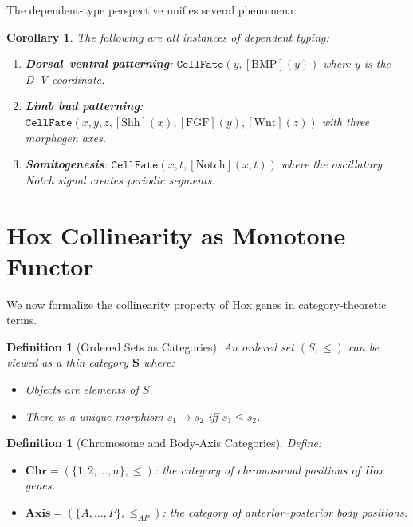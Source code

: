 \documentclass[12pt,a4paper]{article}
\newtheorem{corollary}[theorem]{Corollary}
\newtheorem{definition}[theorem]{Definition}
\begin{document}
The dependent-type perspective unifies several phenomena:

\begin{corollary}
The following are all instances of dependent typing:
\begin{enumerate}
  \item \textbf{Dorsal--ventral patterning}: $\texttt{CellFate}(y, [\text{BMP}](y))$
    where $y$ is the D--V coordinate.
  \item \textbf{Limb bud patterning}: $\texttt{CellFate}(x, y, z,
    [\text{Shh}](x), [\text{FGF}](y), [\text{Wnt}](z))$ with three
    morphogen axes.
  \item \textbf{Somitogenesis}: $\texttt{CellFate}(x, t, [\text{Notch}](x,t))$
    where the oscillatory Notch signal creates periodic segments.
\end{enumerate}
\end{corollary}


\section{Hox Collinearity as Monotone Functor}\label{sec:hox-functor}

We now formalize the collinearity property of Hox genes in
category-theoretic terms.

\begin{definition}[Ordered Sets as Categories]\label{def:ordered-cat}
An ordered set $(S, \leq)$ can be viewed as a thin category
$\mathbf{S}$ where:
\begin{itemize}
  \item Objects are elements of $S$.
  \item There is a unique morphism $s_1 \to s_2$ iff $s_1 \leq s_2$.
\end{itemize}
\end{definition}

\begin{definition}[Chromosome and Body-Axis Categories]\label{def:chr-body-cat}
Define:
\begin{itemize}
  \item $\mathbf{Chr} = (\{1, 2, \ldots, n\}, \leq)$: the category
    of chromosomal positions of Hox genes.
  \item $\mathbf{Axis} = (\{A, \ldots, P\}, \leq_{AP})$: the category
    of anterior--posterior body positions.
\end{itemize}
\end{definition}
\end{document}
